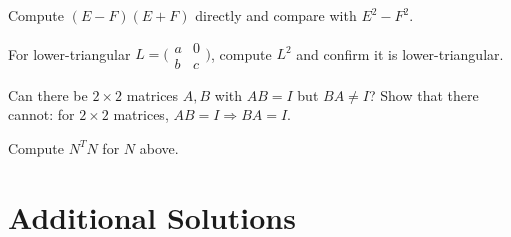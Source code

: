\begin{problems}
    \item Compute $(E - F)(E + F)$ directly and compare with $E^{2} - F^{2}$.
    \item For lower-triangular $L = \bigl(\begin{smallmatrix} a & 0 \\ b & c \end{smallmatrix}\bigr)$, compute $L^{2}$ and confirm it is lower-triangular.
    \item Can there be $2 \times 2$ matrices $A, B$ with $A B = I$ but $B A \neq I$? Show that there cannot: for $2 \times 2$ matrices, $A B = I \Rightarrow B A = I$.
    \item Compute $N^{T} N$ for $N$ above.
\end{problems}

\section{Additional Solutions}

